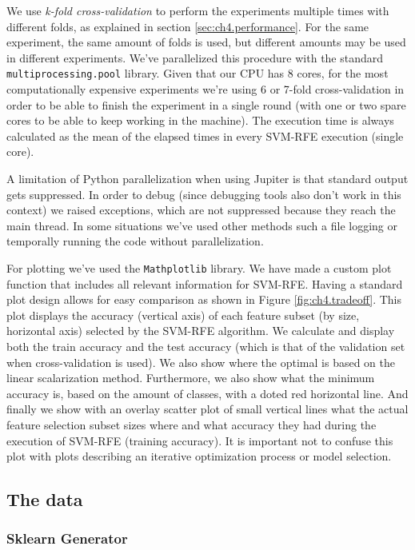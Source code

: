 We use \emph{k-fold cross-validation} to perform the experiments multiple times with different folds, as explained in section \ref{sec:ch4.performance}. For the same experiment, the same amount of folds is used, but different amounts may be used in different experiments. We've parallelized this procedure with the standard \texttt{multiprocessing.pool} library. Given that our CPU has 8 cores, for the most computationally expensive experiments we're using 6 or 7-fold cross-validation in order to be able to finish the experiment in a single round (with one or two spare cores to be able to keep working in the machine). The execution time is always calculated as the mean of the elapsed times in every SVM-RFE execution (single core).

A limitation of Python parallelization when using Jupiter is that standard output gets suppressed. In order to debug (since debugging tools also don't work in this context) we raised exceptions, which are not suppressed because they reach the main thread. In some situations we've used other methods such a file logging or temporally running the code without parallelization.

For plotting we've used the \texttt{Mathplotlib} library. We have made a custom plot function that includes all relevant information for SVM-RFE. Having a standard plot design allows for easy comparison as shown in Figure \ref{fig:ch4.tradeoff}. This plot displays the accuracy (vertical axis) of each feature subset (by size, horizontal axis) selected by the SVM-RFE algorithm. We calculate and display both the train accuracy and the test accuracy (which is that of the va\-lid\-ation set when cross-validation is used). We also show where the optimal is based on the linear scalarization method. Furthermore, we also show what the minimum accuracy is, based on the amount of classes, with a doted red horizontal line. And finally we show with an overlay scatter plot of small vertical lines what the actual feature selection subset sizes where and what accuracy they had during the execution of SVM-RFE (training accuracy). It is important not to confuse this plot with plots describing an iterative optimization process or model selection.

\subsection{The data}

\subsubsection*{Sklearn Generator}

